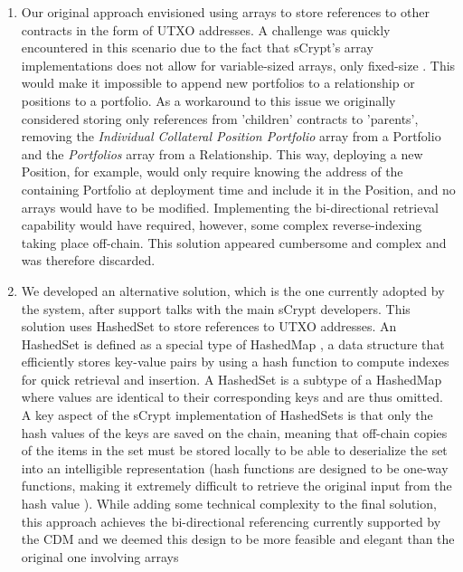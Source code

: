 \begin{enumerate}
    \item \label{item:arrays} Our original approach envisioned using arrays to store references to other contracts in the form of UTXO addresses. A challenge was quickly encountered in this scenario due to the fact that sCrypt's array implementations does not allow for variable-sized arrays, only fixed-size \citep{scrypt_arrays}. This would make it impossible to append new portfolios to a relationship or positions to a portfolio. As a workaround to this issue we originally considered storing only references from 'children' contracts to 'parents', removing the \textit{Individual Collateral Position Portfolio} array from a Portfolio and the \textit{Portfolios} array from a Relationship. This way, deploying a new Position, for example, would only require knowing the address of the containing Portfolio at deployment time and include it in the Position, and no arrays would have to be modified. Implementing the bi-directional retrieval capability would have required, however, some complex reverse-indexing \citep{inverted_index} taking place off-chain. This solution appeared cumbersome and complex and was therefore discarded.

    \item We developed an alternative solution, which is the one currently adopted by the system, after support talks with the main sCrypt developers. This solution uses HashedSet to store references to UTXO addresses. An HashedSet \citep{hashed_set} is defined as a special type of HashedMap \citep{hashed_map}, a data structure that efficiently stores key-value pairs by using a hash function to compute indexes for quick retrieval and insertion. A HashedSet is a subtype of a HashedMap where values are identical to their corresponding keys and are thus omitted. A key aspect of the sCrypt implementation of HashedSets is that only the hash values of the keys are saved on the chain, meaning that off-chain copies of the items in the set must be stored locally to be able to deserialize the set into an intelligible representation (hash functions are designed to be one-way functions, making it extremely difficult to retrieve the original input from the hash value \citep{invert_hash_functions}). While adding some technical complexity to the final solution, this approach achieves the bi-directional referencing currently supported by the CDM and we deemed this design to be more feasible and elegant than the original one involving arrays

\end{enumerate}

